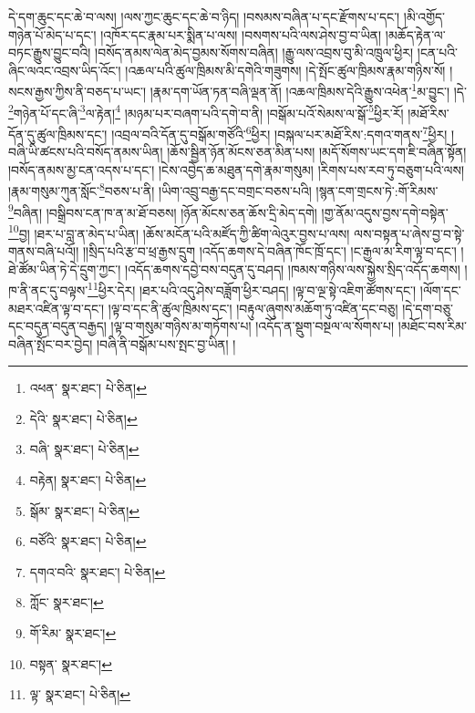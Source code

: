 དེ་དག་ཆུང་དང་ཆེ་བ་ལས། །ལས་ཀྱང་ཆུང་དང་ཆེ་བ་ཉིད། །བསམས་བཞིན་པ་དང་རྫོགས་པ་དང་། །མི་འགྱོད་གཉེན་པོ་མེད་པ་དང་། །འཁོར་དང་རྣམ་པར་སྨིན་པ་ལས། །བསགས་པའི་ལས་ཤེས་བྱ་བ་ཡིན། །མཆོད་རྟེན་ལ་བཏང་རྒྱུས་བྱུང་བའི། །བསོད་ནམས་ལེན་མེད་བྱམས་སོགས་བཞིན། །རྒྱུ་ལས་འབྲས་བུ་མི་འཁྲུལ་ཕྱིར། །ངན་པའི་ཞིང་ལའང་འབྲས་ཡིད་འོང་། །འཆལ་པའི་ཚུལ་ཁྲིམས་མི་དགེའི་གཟུགས། །དེ་སྤོང་ཚུལ་ཁྲིམས་རྣམ་གཉིས་སོ། །སངས་རྒྱས་ཀྱིས་ནི་བཅད་པ་ཡང་། །རྣམ་དག་ཡོན་ཏན་བཞི་ལྡན་ནོ། །འཆལ་ཁྲིམས་དེའི་རྒྱུས་འཕེན་\footnote{འཕན་  སྣར་ཐང་།  པེ་ཅིན། }མ་བྱུང་། །དེ་\footnote{དེའི་  སྣར་ཐང་།  པེ་ཅིན། }གཉེན་པོ་དང་ཞི་\footnote{བཞི་  སྣར་ཐང་།  པེ་ཅིན། }ལ་རྟེན།\footnote{བརྟེན།  སྣར་ཐང་།  པེ་ཅིན། } །མཉམ་པར་བཞག་པའི་དགེ་བ་ནི། །བསྒོམ་པའོ་སེམས་ལ་སྒོ་\footnote{སྒོམ་  སྣར་ཐང་།  པེ་ཅིན། }ཕྱིར་རོ། །མཐོ་རིས་དོན་དུ་ཚུལ་ཁྲིམས་དང་། །འབྲལ་བའི་དོན་དུ་བསྒོམ་གཙོའི་\footnote{བཙོའི་  སྣར་ཐང་།  པེ་ཅིན། }ཕྱིར། །བསྐལ་པར་མཐོ་རིས་:དགའ་གནས་\footnote{དགའ་བའི་  སྣར་ཐང་།  པེ་ཅིན། }ཕྱིར། །བཞི་ཡི་ཚངས་པའི་བསོད་ནམས་ཡིན། །ཆོས་སྦྱིན་ཉོན་མོངས་ཅན་མིན་པས། །མདོ་སོགས་ཡང་དག་ཇི་བཞིན་སྟོན། །བསོད་ནམས་མྱ་ངན་འདས་པ་དང་། །ངེས་འབྱེད་ཆ་མཐུན་དགེ་རྣམ་གསུམ། །རིགས་པས་རབ་ཏུ་བཅུག་པའི་ལས། །རྣམ་གསུམ་ཀུན་སློང་\footnote{ཀློང་  སྣར་ཐང་། }བཅས་པ་ནི། །ཡིག་འབྲུ་བརྒྱ་དང་བགྲང་བཅས་པའི། །སྙན་ངག་གྲངས་ཏེ་:གོ་རིམས་\footnote{གོ་རིམ་  སྣར་ཐང་། }བཞིན། །བསྒྲིབས་ངན་ཁ་ན་མ་ཐོ་བཅས། །ཉོན་མོངས་ཅན་ཆོས་དྲི་མེད་དགེ། །གྱ་ནོམ་འདུས་བྱས་དགེ་བསྟེན་\footnote{བསྟན་  སྣར་ཐང་། }བྱ། །ཐར་པ་བླ་ན་མེད་པ་ཡིན། །ཆོས་མངོན་པའི་མཛོད་ཀྱི་ཚིག་ལེའུར་བྱས་པ་ལས། ལས་བསྟན་པ་ཞེས་བྱ་བ་སྟེ་གནས་བཞི་པའོ།། །།སྲིད་པའི་རྩ་བ་ཕྲ་རྒྱས་དྲུག །འདོད་ཆགས་དེ་བཞིན་ཁོང་ཁྲོ་དང་། །ང་རྒྱལ་མ་རིག་ལྟ་བ་དང་། །ཐེ་ཚོམ་ཡིན་ཏེ་དེ་དྲུག་ཀྱང་། །འདོད་ཆགས་དབྱེ་བས་བདུན་དུ་བཤད། །ཁམས་གཉིས་ལས་སྐྱེས་སྲིད་འདོད་ཆགས། །ཁ་ནི་ནང་དུ་བལྟས་\footnote{ལྟ་  སྣར་ཐང་།  པེ་ཅིན། }ཕྱིར་དེར། །ཐར་པའི་འདུ་ཤེས་བཟློག་ཕྱིར་བཤད། །ལྟ་བ་ལྔ་སྟེ་འཇིག་ཚོགས་དང་། །ལོག་དང་མཐར་འཛིན་ལྟ་བ་དང་། །ལྟ་བ་དང་ནི་ཚུལ་ཁྲིམས་དང་། །བརྟུལ་ཞུགས་མཆོག་ཏུ་འཛིན་དང་བཅུ། །དེ་དག་བཅུ་དང་བདུན་བདུན་བརྒྱད། །ལྟ་བ་གསུམ་གཉིས་མ་གཏོགས་པ། །འདོད་ན་སྡུག་བསྔལ་ལ་སོགས་པ། །མཐོང་བས་རིམ་བཞིན་སྤོང་བར་བྱེད། །བཞི་ནི་བསྒོམ་པས་སྤང་བྱ་ཡིན། །
